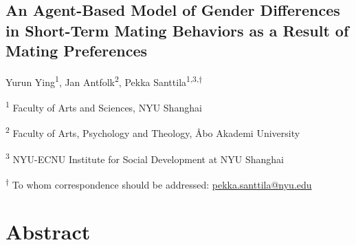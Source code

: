\documentclass[
  11pt,
]{article}
\author{}
\date{\vspace{-2.5em}}
\begin{document}
\begin{titlepage}

\begin{center}

\vspace*{30mm}

\hypertarget{an-agent-based-model-of-gender-differences-in-short-term-mating-behaviors-as-a-result-of-mating-preferences}{%
\section*{An Agent-Based Model of Gender Differences in Short-Term
Mating Behaviors as a Result of Mating
Preferences}\label{an-agent-based-model-of-gender-differences-in-short-term-mating-behaviors-as-a-result-of-mating-preferences}}

\vspace{30mm}

Yurun Ying\textsuperscript{1}, Jan Antfolk\textsuperscript{2}, Pekka
Santtila\textsuperscript{1,3,\(\dagger\)}

\textsuperscript{1} Faculty of Arts and Sciences, NYU Shanghai

\textsuperscript{2} Faculty of Arts, Psychology and Theology, Åbo
Akademi University

\textsuperscript{3} NYU-ECNU Institute for Social Development at NYU
Shanghai

\end{center}

\vspace{40mm}

\textsuperscript{\(\dagger\)} To whom correspondence should be
addressed: \url{pekka.santtila@nyu.edu}

\end{titlepage}

\newpage

\hypertarget{abstract}{%
\section*{Abstract}\label{abstract}}
\end{document}

